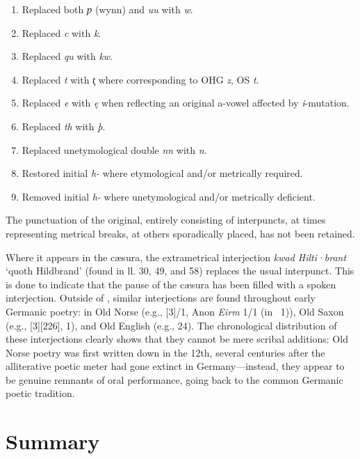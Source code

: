 \begin{enumerate}
  \item Replaced both \emph{ƿ} (wynn) and \emph{uu} with \emph{w}.
  \item Replaced \emph{c} with \emph{k}.
  \item Replaced \emph{qu} with \emph{kw}.
  \item Replaced \emph{t} with \emph{t̨} where corresponding to OHG \emph{z}, OS \emph{t}.
  \item Replaced \emph{e} with \emph{ę} when reflecting an original a-vowel affected by \emph{i}-mutation.
  \item Replaced \emph{th} with \emph{þ}.
  \item Replaced unetymological double \emph{nn} with \emph{n}.
  \item Restored initial \emph{h-} where etymological and/or metrically required.
  \item Removed initial \emph{h-} where unetymological and/or metrically deficient.
\end{enumerate}

The punctuation of the original, entirely consisting of interpuncts, at times representing metrical breaks, at others sporadically placed, has not been retained.

Where it appears in the cæsura, the extrametrical interjection \emph{kwad Hilti·brant} ‘quoth Hildbrand’ (found in ll. 30, 49, and 58) replaces the usual interpunct.  This is done to indicate that the pause of the cæsura has been filled with a spoken interjection.  Outside of \Hildebrandslied, similar interjections are found throughout early Germanic poetry: in Old Norse (e.g., [3]/1, Anon \emph{Eirm} 1/1 (in \Skp\ 1)), Old Saxon (e.g., [3][226],  1), and Old English (e.g.,  24).
The chronological distribution of these interjections clearly shows that they cannot be mere scribal additions: Old Norse poetry was first written down in the 12th, several centuries after the alliterative poetic meter had gone extinct in Germany---instead, they appear to be genuine remnants of oral performance, going back to the common Germanic poetic tradition.

\section{Summary}

